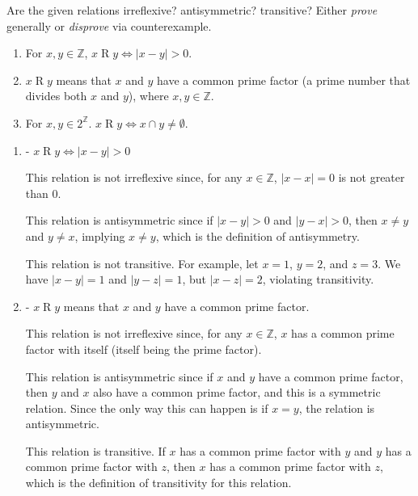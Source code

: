 \documentclass{article}
\newcommand{\Z}{\mathbb{Z}}
\theoremstyle{definition}
\begin{document}
\begin{question}
    Are the given relations irreflexive? antisymmetric? transitive? Either \textit{prove} generally or \textit{disprove} via 
    counterexample.
    	\begin{enumerate}
	\item For $x, y \in \Z$,  $x\mathrel{R}y \iff |x - y| > 0$. 
	\item  $x\mathrel{R}y$ means that $x$ and $y$ have a common prime factor (a prime number that divides both $x$ and $y$), 
	where $x, y \in \Z$.
	\item For $x, y \in 2^{\Z}$. $x\mathrel{R}y \iff x \cap y \neq \emptyset$.
	\end{enumerate}
\end{question}
\begin{solution}
\begin{enumerate}
    \item 
    - \(x \mathrel{R} y \iff |x - y| > 0\)
    
    This relation is not irreflexive since, for any \(x \in \Z\), \(|x - x| = 0\) is not greater than 0.
    
    This relation is antisymmetric since if \(|x - y| > 0\) and \(|y - x| > 0\), then \(x \neq y\) and \(y \neq x\), implying \(x \neq y\), which is the definition of antisymmetry.
    
    This relation is not transitive. For example, let \(x = 1\), \(y = 2\), and \(z = 3\). We have \(|x - y| = 1\) and \(|y - z| = 1\), but \(|x - z| = 2\), violating transitivity.
    
    \item 
    - \(x \mathrel{R} y\) means that \(x\) and \(y\) have a common prime factor.
    
    This relation is not irreflexive since, for any \(x \in \Z\), \(x\) has a common prime factor with itself (itself being the prime factor).
    
    This relation is antisymmetric since if \(x\) and \(y\) have a common prime factor, then \(y\) and \(x\) also have a common prime factor, and this is a symmetric relation. Since the only way this can happen is if \(x = y\), the relation is antisymmetric.
    
    This relation is transitive. If \(x\) has a common prime factor with \(y\) and \(y\) has a common prime factor with \(z\), then \(x\) has a common prime factor with \(z\), which is the definition of transitivity for this relation.
    

\end{enumerate}
\end{solution}
\end{document}
